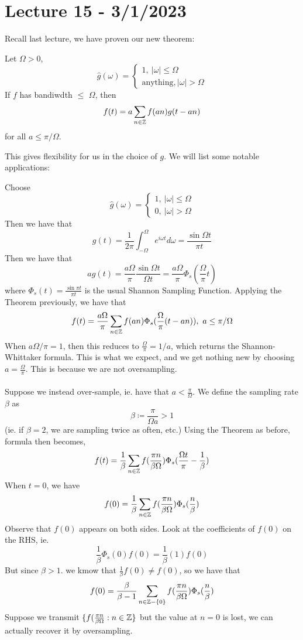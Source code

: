 \documentclass{article}
\begin{document}
\newpage
\section{Lecture 15 - 3/1/2023}

Recall last lecture, we have proven our new theorem:
\begin{theorem}
    Let $\Omega > 0$, 
    \[
    \widehat{g}(\omega) = \begin{cases}
        1,\ |\omega| \leq \Omega\\
        \text{anything}, |\omega| > \Omega
    \end{cases}
    \]
    If $f$ has bandiwdth $\leq$ $\Omega$, then
    \[f(t) = a \sum_{n \in \mathbb{Z}} f(an) g(t - an)\]
    for all $a \leq \pi/\Omega$.
\end{theorem}

This gives flexibility for us in the choice of $g$. We will list some notable applications:

\begin{example}
    Choose
    \[\widehat{g}(\omega) = \begin{cases}
        1,\ |\omega| \leq \Omega\\
        0,\ |\omega| > \Omega
    \end{cases}\]
    Then we have that
    \[g(t) = \frac{1}{2\pi} \int_{-\Omega}^\Omega e^{i\omega t} d\omega = \frac{\sin \Omega t}{\pi t}\]
    Then we have that
    \[a g(t) = \frac{a \Omega}{\pi} \frac{\sin \Omega t}{\Omega t} = \frac{a \Omega}{\pi} \Phi_s(\frac{\Omega}{\pi} t)\]
    where $\Phi_s(t) = \frac{\sin \pi t}{\pi t}$ is the usual Shannon Sampling Function. Applying the Theorem previously, we have that
    \[f(t) = \frac{a \Omega}{\pi} \sum_{n \in \mathbb{Z}} f(an) \Phi_s(\frac{\Omega}{\pi}(t - an)),\ a \leq \pi/\Omega\]
    When $a \Omega /\pi = 1$, then this reduces to $\frac{\Omega}{\pi} = 1/a$, which returns the Shannon-Whittaker formula. This is what we expect, and we get nothing new by choosing $a = \frac{\Omega}{\pi}$. This is because we are not oversampling.\\\\
    Suppose we instead over-sample, ie. have that $a < \frac{\pi}{\Omega}$. We define the sampling rate $\beta$ as
    \[\beta \coloneqq \frac{\pi}{\Omega a} > 1\]
    (ie. if $\beta = 2$, we are sampling twice as often, etc.) Using the Theorem as before, formula then becomes,
    \[f(t) = \frac{1}{\beta} \sum_{n \in \mathbb{Z}} f(\frac{\pi n}{\beta \Omega}) \Phi_s(\frac{\Omega t}{\pi} - \frac{1}{\beta})\]
    When $t = 0$, we have
    \[f(0) = \frac{1}{\beta} \sum_{n \in \mathbb{Z}} f(\frac{\pi n}{\beta \Omega}) \Phi_s(\frac{n}{\beta})\]
    Observe that $f(0)$ appears on both sides. Look at the coefficients of $f(0)$ on the RHS, ie.
    \[\frac{1}{\beta} \Phi_s(0) f(0) = \frac{1}{\beta}(1) f(0)\]
    But since $\beta > 1$. we kmow that $\frac{1}{\beta} f(0) \neq f(0)$, so we have that
    \[f(0) = \frac{\beta}{\beta - 1} \sum_{n \in \mathbb{Z} - \{0\}} f(\frac{\pi n}{\beta \Omega}) \Phi_s(\frac{n}{\beta})\]
    Suppose we transmit $\{f(\frac{\pi n}{\beta \Omega}: n \in \mathbb{Z}\}$ but the value at $n = 0$ is lost, we can actually recover it by oversampling.
\end{example}
\end{document}
